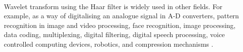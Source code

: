 \paragraph{}
Wavelet transform using the Haar filter is widely used in other fields. For
example, as a way of digitalising an analogue signal in A-D converters, pattern
recognition in image and video processing, face recognition, image processing,
data coding, multiplexing, digital filtering, digital speech processing, voice
controlled computing devices, robotics, and compression mechanisms \cite{khan,
stankovic, wadkar}.

\begin{comment}
- Literature study
- Software evolution
- Project success
- Project survivability

This chapter contains all the information needed to put the thesis into
context. It is common to use (a revised version) of your literature survey for
this purpose.
It is important to refer from your text to sources you have used, as listed in
your bibliography section (appendix). For example, “XP is a recent agile
development method [1]” is a common style of doing this, where the following
entry would be included in your bibliography:
[1] K. Beck, E. Gamma, Test infected: Programmers love writing tests, Java
Report 3 (7) (1998) 51–56.
If you want to refer to books you have read as part of the curriculum, you can
also do so in this way.
Have a look at Chapter 2 of this example thesis at Paul’s
homepage\footnote{http://homepages.cwi.nl/~paulk/thesesMasterSoftwareEngineering/2006/RichardKettelerij.pdf}.
\end{comment}